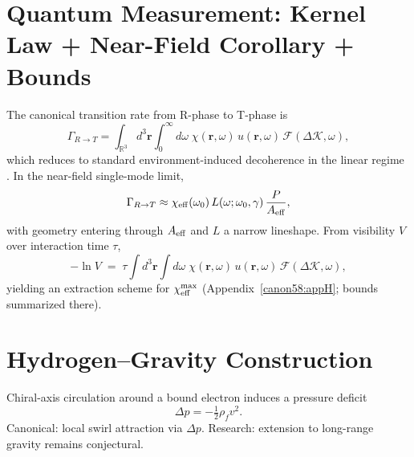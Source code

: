 \documentclass[reprint,aps,onecolumn,nofootinbib]{revtex4-2}
\newcommand{\rhof}{\rho_{\!f}}                           %
\begin{document}
    \section{Quantum Measurement: Kernel Law + Near-Field Corollary + Bounds}\label{canon58:measurement}
    The canonical transition rate from R-phase to T-phase is
    \begin{equation}
    \Gamma_{R\to T}
    =\int_{\mathbb{R}^3}\! d^3\mathbf r \int_{0}^{\infty}\! d\omega\;
    \chi(\mathbf r,\omega)\,u(\mathbf r,\omega)\,\mathcal F(\Delta\mathcal K,\omega),
    \label{eq:kernel}
    \end{equation}
    which reduces to standard environment-induced decoherence in the linear regime \cite{Zurek2003}.
    In the near-field single-mode limit,
    \[
        \Gamma_{R\to T}\approx \chi_{\rm eff}(\omega_0)\,L(\omega;\omega_0,\gamma)\,\frac{P}{A_{\rm eff}},
    \]
    with geometry entering through $A_{\rm eff}$ and $L$ a narrow lineshape. From visibility $V$ over interaction time $\tau$,
    \[
        -\ln V \;=\; \tau \int d^3\mathbf r \int d\omega\;\chi(\mathbf r,\omega)\,u(\mathbf r,\omega)\,\mathcal F(\Delta\mathcal K,\omega),
    \]
    yielding an extraction scheme for $\chi_{\rm eff}^{\max}$ (Appendix~\ref{canon58:appH}; bounds summarized there). %



    \section{Hydrogen--Gravity Construction}\label{canon58:hydro-grav}
    Chiral-axis circulation around a bound electron induces a pressure deficit
    \[
        \Delta p = -\tfrac12 \rhof v^2.
    \]
    Canonical: local swirl attraction via $\Delta p$. %
    Research: extension to long-range gravity remains conjectural. %
\end{document}
